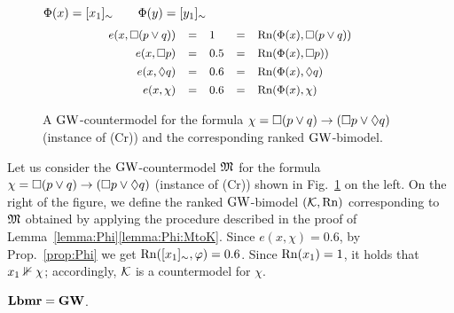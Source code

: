 \begin{figure}[t]
\begin{minipage}{15em}
 \end{minipage}
\\[1ex]
 $\Phi(x) = [x_1]_\sim\qquad  \Phi(y) = [y_1]_\sim$
   \[\small
    \begin{array}{rclcl}
      e(x,\Box (p\lor q))&=& 1 &=& \mathrm{Rn}(\Phi(x),\Box(p\lor q))
      \\[1ex]
      e(x,\Box p) &=&  0.5&=& \mathrm{Rn}(\Phi(x),\Box p))
      \\[1ex]
      e(x,\lozenge q)&=&  0.6 &=& \mathrm{Rn}(\Phi(x),\lozenge q)
      \\[1ex]
      e(x,\chi) &=& 0.6  &=& \mathrm{Rn}(\Phi(x),\chi)
    \end{array}
  \]
  
  \caption{A $\mbox{$\mathrm{GW}$}$-countermodel for the formula $\chi=\Box (p\lor q)\to
    (\Box p \lor \lozenge q) $ (instance of (Cr)) and the corresponding ranked $\mbox{$\mathrm{GW}$}$-bimodel.}
  \label{fig:corrCrispAx}
\end{figure}



 
 \begin{example}\label{ex:countermodelCrisp}
Let us consider the $\mbox{$\mathrm{GW}$}$-countermodel $\mathfrak{M}$ for the formula $\chi=\Box (p\lor q)\to (\Box p \lor \lozenge q) $ (instance of (Cr)) 
shown in Fig.~\ref{fig:corrCrispAx} on the left.
On the right of the figure, we define the ranked $\mbox{$\mathrm{GW}$}$-bimodel $(\mathcal{K},\mathrm{Rn})$  corresponding to $\mathfrak{M}$ obtained by applying the
procedure described in the proof of  Lemma~\ref{lemma:Phi}\ref{lemma:Phi:MtoK}. 
Since $e(x,\chi) = 0.6$, by Prop.~\ref{prop:Phi}
we get  $\mathrm{Rn}([x_1]_\sim,\varphi)=0.6$. Since $\mathrm{Rn}(x_1)=1$, it holds that
$x_1\nVdash \chi$; accordingly, $\mathcal{K}$ is a countermodel for $\chi$.
 \end{example}



\begin{proposition}\label{prop:equivGW}
  $\mathbf{Lbmr} =\mathbf{GW}$.
\end{proposition}

